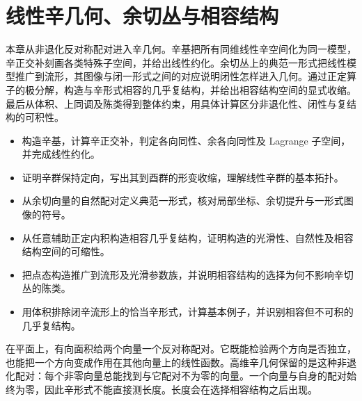 
% 
% 

\chapter{线性辛几何、余切丛与相容结构}
\label{g4:ch:07}

\begin{chapterabstract}
本章从非退化反对称配对进入辛几何。辛基把所有同维线性辛空间化为同一模型，辛正交补刻画各类特殊子空间，并给出线性约化。余切丛上的典范一形式把线性模型推广到流形，其图像与闭一形式之间的对应说明闭性怎样进入几何。通过正定算子的极分解，构造与辛形式相容的几乎复结构，并给出相容结构空间的显式收缩。最后从体积、上同调及陈类得到整体约束，用具体计算区分非退化性、闭性与复结构的可积性。
\end{chapterabstract}

\begin{learninggoals}
\begin{itemize}
	\item 构造辛基，计算辛正交补，判定各向同性、余各向同性及 Lagrange 子空间，并完成线性约化。
	\item 证明辛群保持定向，写出其到酉群的形变收缩，理解线性辛群的基本拓扑。
	\item 从余切向量的自然配对定义典范一形式，核对局部坐标、余切提升与一形式图像的符号。
	\item 从任意辅助正定内积构造相容几乎复结构，证明构造的光滑性、自然性及相容结构空间的可缩性。
	\item 把点态构造推广到流形及光滑参数族，并说明相容结构的选择为何不影响辛切丛的陈类。
	\item 用体积排除闭辛流形上的恰当辛形式，计算基本例子，并识别相容但不可积的几乎复结构。
\end{itemize}
\end{learninggoals}

在平面上，有向面积给两个向量一个反对称配对。它既能检验两个方向是否独立，也能把一个方向变成作用在其他向量上的线性函数。高维辛几何保留的是这种非退化配对：每个非零向量总能找到与它配对不为零的向量。一个向量与自身的配对始终为零，因此辛形式不能直接测长度。长度会在选择相容结构之后出现。

\ProseParagraphBreak

